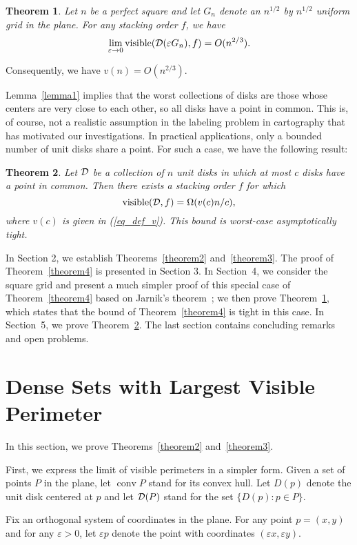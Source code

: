 \documentclass[11pt]{article}
\newtheorem{thm}{Theorem}             \newtheorem{lem}[thm]{Lemma}
\DeclareMathOperator{\vis}{\mathrm{visible}}
\DeclareMathOperator{\conv}{\mathrm{conv}}
\newcommand{\eps}{\varepsilon}
\begin{document}
\begin{thm}\label{theorem5}
Let $n$ be a perfect square and let $G_n$ denote an $n^{1/2}$ by $n^{1/2}$ uniform grid in the plane. For any stacking order $f$, we have
$$\lim_{\eps\rightarrow 0}\vis({\cal D}(\eps G_n),f)=O(n^{2/3}).$$
\end{thm}

Consequently, we have $v(n)=O(n^{2/3})$.

Lemma~\ref{lemma1} implies that the worst collections of disks are those whose centers are very close to each other, so all disks have a point in common. This is, of course, not a
realistic assumption in the labeling problem in cartography that has motivated
our investigations. In practical applications, only a bounded number of unit
disks share a point. For such a case, we have the following result:

\begin{thm}\label{thm_bounded_overlap}
Let $\cal D$ be a collection of $n$ unit disks in which at most $c$ disks have a point in common. Then there exists a stacking order $f$ for which
$$\vis({\cal D}, f) = \Omega(v(c) n / c),$$
where $v(c)$ is given in (\ref{eq_def_v}). This bound is worst-case asymptotically tight.
\end{thm}

In Section 2, we establish Theorems~\ref{theorem2} and~\ref{theorem3}. The proof of Theorem~\ref{theorem4} is
presented in Section 3. In Section~4, we consider the square grid and present a
much simpler proof of this special case of Theorem~\ref{theorem4}
based on Jarnik's theorem~\cite{Ja25}; we then prove Theorem~\ref{theorem5}, which states that the
bound of Theorem~\ref{theorem4} is tight in this case. In Section~5, we prove Theorem~\ref{thm_bounded_overlap}. The last section contains concluding
remarks and open problems.

\section{Dense Sets with Largest Visible Perimeter}

In this section, we prove Theorems~\ref{theorem2} and~\ref{theorem3}.

First, we express the limit of visible perimeters in a simpler form. Given a set of points $P$ in the plane, let $\conv P$
stand for its convex hull. Let $D(p)$ denote the unit disk centered at
$p$ and let ${\cal D}(P)$ stand for the set $\{D(p) : p\in P\}$.

Fix an orthogonal system of coordinates in the plane. For any point $p=(x,y)$ and for any $\eps>0$, let $\eps p$ denote the point with coordinates $(\eps x,\eps y)$.
\end{document}

